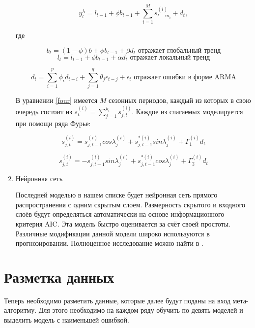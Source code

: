 \documentclass[a4paper,12pt]{article}
\begin{document}
\begin{enumerate}
 \begin{equation}
 	y_t^\lambda = l_{t - 1} + \phi b_{t - 1} + \sum_{i = 1}^{M} s_{t - m_i}^{(i)} + d_t,
 	\label{four}
 \end{equation}	
 
 где 
 
 \[ b_t = (1 - \phi)b + \phi b_{t-1} + \beta d_t \text{ отражает глобальный тренд}\]
 \[l_t = l_{t - 1} + \phi b_{t - 1} + \alpha d_t \text{ отражает локальный тренд} \]
 
 \[d_t = \sum_{i = 1}^{p}\phi_i d_{t - i} + \sum_{j = 1}^{q} \theta_j \epsilon_{t - j} + \epsilon_t \text{ отражает ошибки в форме ARMA} \]
 
 В уравнении \ref{four} имеется $ M $ сезонных периодов, каждый из которых в свою очередь состоит из $ s_t^{(i)} = \sum_{j = 1}^{k_i}s_{j, t}^{(i)}$. Каждое из слагаемых моделируется при помощи ряда Фурье:
 
 \[ s_{j, t}^{(i)} = s_{j, t - 1}^{(i)}cos\lambda_j^{(i)} + s_{j, t - 1}^{*(i)} sin\lambda_j^{(i)} + \Gamma_1^{(i)} d_t\]
 
  \[ s_{j, t}^{(i)} = - s_{j, t - 1}^{(i)}sin\lambda_j^{(i)} + s_{j, t - 1}^{*(i)} cos\lambda_j^{(i)} + \Gamma_2^{(i)} d_t\]
 
 \item Нейронная сеть
 
 Последней моделью в нашем списке будет нейронная сеть прямого распространения с одним скрытым слоем. Размерность скрытого и входного слоёв будут определяться автоматически на основе информационного критерия AIC.  Эта модель быстро оценивается за счёт своей простоты. Различные модификации данной модели широко используются в прогнозировании. Полноценное исследование можно найти в \cite{nnet}. 
 
\end{enumerate}

\newpage

\section{Разметка данных}

Теперь необходимо разметить данные, которые далее будут поданы на вход мета-алгоритму. Для этого необходимо на каждом ряду обучить по девять моделей и выделить модель с наименьшей ошибкой. 
\end{document}
